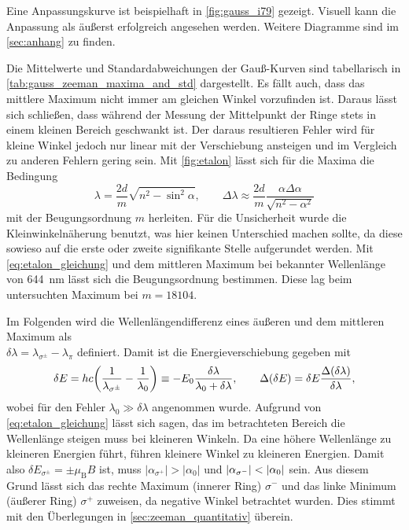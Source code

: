 Eine Anpassungskurve ist beispielhaft in \cref{fig:gauss_i79} gezeigt. Visuell
kann die Anpassung als äußerst erfolgreich angesehen werden. Weitere Diagramme 
sind im \cref{sec:anhang} zu finden.


Die Mittelwerte und Standardabweichungen der Gauß-Kurven sind tabellarisch in \cref{tab:gauss_zeeman_maxima_and_std}
dargestellt. Es fällt auch, dass das mittlere Maximum nicht immer am gleichen Winkel vorzufinden ist. Daraus lässt sich 
schließen, dass während der Messung der Mittelpunkt der Ringe stets in einem kleinen Bereich geschwankt 
ist. Der daraus resultieren Fehler wird für kleine Winkel 
jedoch nur linear mit der Verschiebung ansteigen und im Vergleich zu anderen Fehlern gering sein.
Mit \cref{fig:etalon} lässt sich für die Maxima die Bedingung 
\begin{equation}
    \lambda = \frac{2d}{m}\sqrt{n^2-\sin^2\alpha}, \qquad 
    \Delta\lambda \approx \frac{2d}{m}\frac{\alpha \Delta\alpha}{\sqrt{n^2 - \alpha^2}}
    \label{eq:etalon_gleichung}
\end{equation}
mit der Beugungsordnung $m$ herleiten. Für die Unsicherheit wurde die Kleinwinkelnäherung benutzt, was 
hier keinen Unterschied machen sollte, da diese sowieso auf die erste oder zweite signifikante Stelle
aufgerundet werden.
Mit \cref{eq:etalon_gleichung} und dem mittleren Maximum bei bekannter Wellenlänge von \SI{644}{\nm}
lässt sich die Beugungsordnung bestimmen. Diese lag beim untersuchten Maximum bei 
$m = \num{18104}$.



Im Folgenden wird die Wellenlängendifferenz eines äußeren und dem mittleren Maximum als 
\\$\delta\lambda = \lambda_{\sigma^\pm} - \lambda_\pi$ definiert. Damit ist die 
Energieverschiebung gegeben mit 
\begin{equation}
    \delta E = hc\qty(\frac{1}{\lambda_{\sigma^\pm}} - \frac{1}{\lambda_0})
        \equiv -E_0\frac{\delta\lambda}{\lambda_0+\delta\lambda}, \qquad
        \Delta(\delta E) = \delta E \frac{\Delta(\delta\lambda)}{\delta\lambda},
        \label{eq:energieverschiebung}
\end{equation}
wobei für den Fehler $\lambda_0\gg\delta\lambda$ angenommen wurde.
Aufgrund von \cref{eq:etalon_gleichung} lässt sich sagen, das im betrachteten Bereich 
die Wellenlänge steigen muss bei kleineren Winkeln. Da eine höhere Wellenlänge zu kleineren 
Energien führt, führen kleinere Winkel zu kleineren Energien. Damit also 
$\delta E_{\sigma^\pm} = \pm \mu_\mathrm B B$ ist, muss $|\alpha_{\sigma^+}| > |\alpha_0|$
und $\abs{\alpha_{\sigma^-}} < \abs{\alpha_0}$ sein. Aus diesem Grund 
lässt sich das rechte Maximum (innerer Ring) $\sigma^-$ und das linke Minimum 
(äußerer Ring) $\sigma^+$ zuweisen, da negative Winkel betrachtet wurden. Dies stimmt mit 
den Überlegungen in \cref{sec:zeeman_quantitativ} überein.

